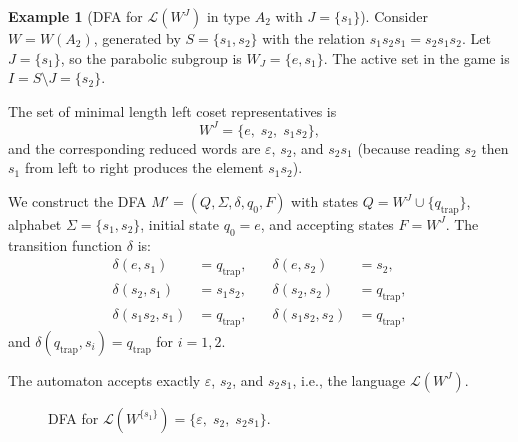 \documentclass[11pt,a4paper]{amsart}
\theoremstyle{plain}
\theoremstyle{definition}
\newtheorem{example}[theorem]{Example}
\theoremstyle{remark}
\begin{document}
\begin{example}[DFA for $\mathcal{L}(W^J)$ in type $A_2$ with $J = \{s_1\}$]
	Consider $W = W(A_2)$, generated by $S = \{s_1, s_2\}$ with the relation $s_1s_2s_1 = s_2s_1s_2$. Let $J = \{s_1\}$, so the parabolic subgroup is $W_J = \{e, s_1\}$. The active set in the game is $I = S \setminus J = \{s_2\}$.
	
	The set of minimal length left coset representatives is
	\[
	W^J = \{ e,\; s_2,\; s_1s_2 \},
	\]
	and the corresponding reduced words are $\varepsilon$, $s_2$, and $s_2 s_1$ (because reading $s_2$ then $s_1$ from left to right produces the element $s_1 s_2$).
	
	We construct the DFA $M' = (Q, \Sigma, \delta, q_0, F)$ with states $Q = W^J \cup \{q_{\text{trap}}\}$, alphabet $\Sigma = \{s_1, s_2\}$, initial state $q_0 = e$, and accepting states $F = W^J$. The transition function $\delta$ is:
	\[
	\begin{aligned}
	\delta(e, s_1) &= q_{\text{trap}}, \quad & \delta(e, s_2) &= s_2, \\
	\delta(s_2, s_1) &= s_1s_2, \quad & \delta(s_2, s_2) &= q_{\text{trap}}, \\
	\delta(s_1s_2, s_1) &= q_{\text{trap}}, \quad & \delta(s_1s_2, s_2) &= q_{\text{trap}},
	\end{aligned}
	\]
	and $\delta(q_{\text{trap}}, s_i) = q_{\text{trap}}$ for $i=1,2$.
	
	The automaton accepts exactly $\varepsilon$, $s_2$, and $s_2 s_1$, i.e., the language $\mathcal{L}(W^J)$.
	
	\begin{figure}[H]
		\centering
		\caption{DFA for $\mathcal{L}(W^{\{s_1\}}) = \{\varepsilon,\; s_2,\; s_2 s_1\}$.}
		\label{fig:dfa_a2}
	\end{figure}
\end{example}
\end{document}
